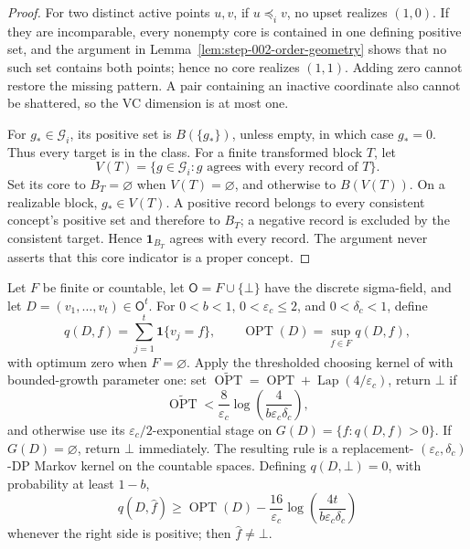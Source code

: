 \begin{proof}
For two distinct active points \(u,v\), if \(u\preceq_i v\), no upset
realizes \((1,0)\).  If they are incomparable, every nonempty core is
contained in one defining positive set, and the argument in
Lemma~\ref{lem:step-002-order-geometry} shows that no such set contains both
points; hence no core realizes \((1,1)\).  Adding zero cannot restore the
missing pattern.  A pair containing an inactive coordinate also cannot be
shattered, so the VC dimension is at most one.

For \(g_*\in\mathcal G_i\), its positive set is \(B(\{g_*\})\), unless
empty, in which case \(g_*=0\).  Thus every target is in the class.  For a
finite transformed block \(T\), let
\begin{equation}\label{eq:step-002-version-space}
V(T)=\{g\in\mathcal G_i:g\text{ agrees with every record of }T\}.
\end{equation}
Set its core to \(B_T=\varnothing\) when \(V(T)=\varnothing\), and otherwise
to \(B(V(T))\).  On a realizable block, \(g_*\in V(T)\).  A positive record
belongs to every consistent concept's positive set and therefore to
\(B_T\); a negative record is excluded by the consistent target.  Hence
\(\mathbf1_{B_T}\) agrees with every record.  The argument never asserts
that this core indicator is a proper concept.
\end{proof}

\begin{lemma}
\label{lem:step-002-countable-choosing}
Let \(F\) be finite or countable, let
\(\mathsf O=F\cup\{\bot\}\) have the discrete sigma-field, and let
\(D=(v_1,\ldots,v_t)\in\mathsf O^t\).  For
\(0<b<1\), \(0<\varepsilon_c\le2\), and \(0<\delta_c<1\), define
\[
q(D,f)=\sum_{j=1}^t\mathbf1\{v_j=f\},\qquad
\operatorname{OPT}(D)=\sup_{f\in F}q(D,f),
\]
with optimum zero when \(F=\varnothing\).  Apply the thresholded choosing
kernel of \citet{bunNissimStemmerVadhan2015} with bounded-growth parameter
one: set
\(\widetilde{\operatorname{OPT}}=\operatorname{OPT}+\operatorname{Lap}(4/\varepsilon_c)\),
return \(\bot\) if
\[
\widetilde{\operatorname{OPT}}
<\frac8{\varepsilon_c}
\log\!\left(\frac4{b\varepsilon_c\delta_c}\right),
\]
and otherwise use its \(\varepsilon_c/2\)-exponential stage on
\(G(D)=\{f:q(D,f)>0\}\).  If \(G(D)=\varnothing\), return \(\bot\)
immediately.  The resulting rule is a replacement-
\((\varepsilon_c,\delta_c)\)-DP Markov kernel on the countable spaces.
Defining \(q(D,\bot)=0\), with probability at least \(1-b\),
\begin{equation}\label{eq:step-002-choosing-utility}
q(D,\hat f)\ge \operatorname{OPT}(D)
-\frac{16}{\varepsilon_c}
\log\!\left(\frac{4t}{b\varepsilon_c\delta_c}\right)
\end{equation}
whenever the right side is positive; then \(\hat f\ne\bot\).
\end{lemma}


